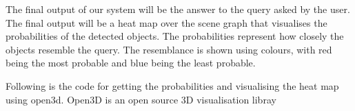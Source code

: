 The final output of our system will be the answer to the query asked by the user. The final output will be a heat map over the scene graph 
that visualises the probabilities of the detected objects. The probabilities represent how closely the objects resemble the query. The resemblance is shown using colours, 
with red being the most probable and blue being the least probable.

Following is the code for getting the probabilities and visualising the heat map using open3d. Open3D is an open source 3D visualisation libray \cite{Zhou2018}
